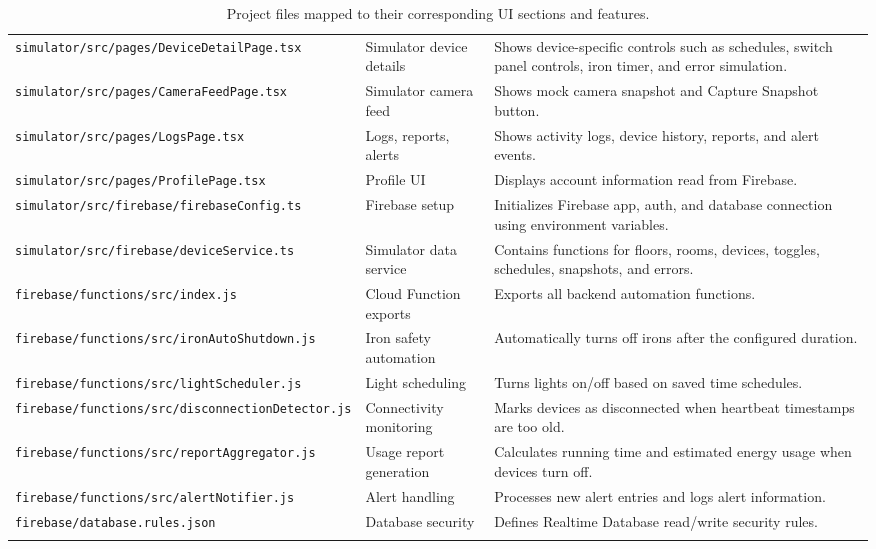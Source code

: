 \documentclass[11pt,a4paper]{article}
\begin{document}
\begin{longtable}{@{}p{5.2cm}p{3.5cm}p{5.2cm}@{}}
\texttt{simulator/src/pages/DeviceDetailPage.tsx} & Simulator device details & Shows device-specific controls such as schedules, switch panel controls, iron timer, and error simulation. \\
\texttt{simulator/src/pages/CameraFeedPage.tsx} & Simulator camera feed & Shows mock camera snapshot and Capture Snapshot button. \\
\texttt{simulator/src/pages/LogsPage.tsx} & Logs, reports, alerts & Shows activity logs, device history, reports, and alert events. \\
\texttt{simulator/src/pages/ProfilePage.tsx} & Profile UI & Displays account information read from Firebase. \\
\texttt{simulator/src/firebase/firebaseConfig.ts} & Firebase setup & Initializes Firebase app, auth, and database connection using environment variables. \\
\texttt{simulator/src/firebase/deviceService.ts} & Simulator data service & Contains functions for floors, rooms, devices, toggles, schedules, snapshots, and errors. \\
\texttt{firebase/functions/src/index.js} & Cloud Function exports & Exports all backend automation functions. \\
\texttt{firebase/functions/src/ironAutoShutdown.js} & Iron safety automation & Automatically turns off irons after the configured duration. \\
\texttt{firebase/functions/src/lightScheduler.js} & Light scheduling & Turns lights on/off based on saved time schedules. \\
\texttt{firebase/functions/src/disconnectionDetector.js} & Connectivity monitoring & Marks devices as disconnected when heartbeat timestamps are too old. \\
\texttt{firebase/functions/src/reportAggregator.js} & Usage report generation & Calculates running time and estimated energy usage when devices turn off. \\
\texttt{firebase/functions/src/alertNotifier.js} & Alert handling & Processes new alert entries and logs alert information. \\
\texttt{firebase/database.rules.json} & Database security & Defines Realtime Database read/write security rules. \\
\bottomrule
\caption{Project files mapped to their corresponding UI sections and features.}
\label{tab:file-ui-map}
\end{longtable}

\end{document}
